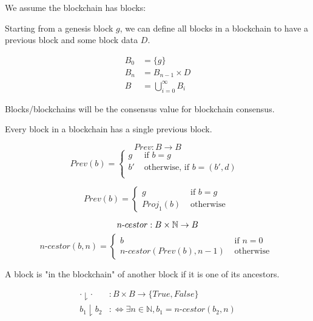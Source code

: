 \begin{defn}
We assume the blockchain has blocks:


Starting from a genesis block $g$, we can define all blocks in a blockchain to have a previous block and some block data $D$.

\begin{defn}[Blocks]
\begin{align*}
B_0 &= \{g\} \\
B_n &= B_{n-1} \times D \\
B &= \bigcup_{i = 0}^{\infty} B_i
\end{align*}
\end{defn}

Blocks/blockchains will be the consensus value for blockchain consensus.

Every block in a blockchain has a single previous block.

\begin{defn}
$$
Prev: B \to B
$$
\[ Prev(b) = \begin{cases}
  g  &\text{ if $b = g$ }\\
  b' &\text{ otherwise, if $b = (b', d)$ }\\
   \end{cases}
\]
\end{defn}

\[ Prev(b) = \left\{
\begin{array}{ll}
      g& \text{ if $b = g$ } \\
      Proj_1(b)& \text{ otherwise }
\end{array}
\right. \]


\begin{defn}
$$
n\text{-}cestor : B \times \mathbb{N} \to B\\
$$
\[ n\text{-}cestor(b, n) = \left\{
\begin{array}{ll}
      b& \text{ if $n = 0$ } \\
      n\text{-}cestor(Prev(b), n - 1)& \text{ otherwise }
\end{array}
\right. \]
\end{defn}


A block is "in the blockchain" of another block if it is one of its ancestors.

\begin{defn}
\begin{align*}
\cdot \downharpoonright \cdot&: B \times B \to \{True, False\} \\
b_1 \downharpoonright b_2 &:\Leftrightarrow \exists n \in \mathbb{N}, b_1 = n\text{-}cestor(b_2, n)
\end{align*}
\end{defn}


\end{defn}
